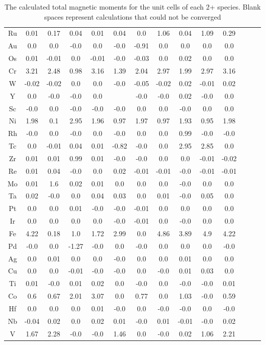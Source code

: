 \documentclass{article}
\begin{document}
\begin{table}
\begin{center}
\begin{tabular}{| c | c | c | c | c | c | c | c | c | c | c | c | c | c |}
Ru & 0.01 & 0.17 & 0.04 & 0.01 & 0.04 & 0.0 & 1.06 & 0.04 & 1.09 & 0.29 &  \\
Au & 0.0 & 0.0 & -0.0 & 0.0 & -0.0 & -0.91 & 0.0 & 0.0 & 0.0 & 0.0 &  \\
Os & 0.01 & -0.01 & 0.0 & -0.01 & -0.0 & -0.03 & 0.0 & 0.02 & 0.0 & 0.0 &  \\
Cr & 3.21 & 2.48 & 0.98 & 3.16 & 1.39 & 2.04 & 2.97 & 1.99 & 2.97 & 3.16 &  \\
W & -0.02 & -0.02 & 0.0 & 0.0 & -0.0 & -0.05 & -0.02 & 0.02 & -0.01 & 0.02 &  \\
Y & 0.0 & -0.0 & -0.0 & 0.0 &  & -0.0 & -0.0 & 0.02 & -0.0 & 0.0 &  \\
Sc & -0.0 & 0.0 & -0.0 & -0.0 & -0.0 & 0.0 & 0.0 & -0.0 & 0.0 & 0.0 &  \\
Ni & 1.98 & 0.1 & 2.95 & 1.96 & 0.97 & 1.97 & 0.97 & 1.93 & 0.95 & 1.98 &  \\
Rh & -0.0 & 0.0 & -0.0 & 0.0 & -0.0 & 0.0 & 0.0 & 0.99 & -0.0 & -0.0 &  \\
Tc & 0.0 & -0.01 & 0.04 & 0.01 & -0.82 & -0.0 & 0.0 & 2.95 & 2.85 & 0.0 &  \\
Zr & 0.01 & 0.01 & 0.99 & 0.01 & -0.0 & -0.0 & 0.0 & 0.0 & -0.01 & -0.02 &  \\
Re & 0.01 & 0.04 & -0.0 & 0.0 & 0.02 & -0.01 & -0.01 & -0.0 & -0.01 & -0.01 &  \\
Mo & 0.01 & 1.6 & 0.02 & 0.01 & 0.0 & 0.0 & 0.0 & -0.0 & 0.0 & 0.0 &  \\
Ta & 0.02 & -0.0 & 0.0 & 0.04 & 0.03 & 0.0 & 0.01 & -0.0 & 0.05 & 0.0 &  \\
Pt & 0.0 & 0.0 & 0.01 & -0.0 & -0.0 & -0.01 & 0.0 & 0.0 & 0.0 & 0.0 &  \\
Ir & 0.0 & 0.0 & 0.0 & 0.0 & -0.0 & -0.01 & 0.0 & -0.0 & 0.0 & 0.0 &  \\
Fe & 4.22 & 0.18 & 1.0 & 1.72 & 2.99 & 0.0 & 4.86 & 3.89 & 4.9 & 4.22 &  \\
Pd & -0.0 & 0.0 & -1.27 & -0.0 & 0.0 & -0.0 & 0.0 & 0.0 & 0.0 & -0.0 &  \\
Ag & 0.0 & 0.01 & 0.0 & 0.0 & -0.0 & 0.0 & 0.0 & 0.01 & 0.0 & 0.0 &  \\
Cu & 0.0 & 0.0 & -0.01 & -0.0 & -0.0 & 0.0 & -0.0 & 0.01 & 0.03 & 0.0 &  \\
Ti & 0.01 & -0.0 & 0.01 & 0.02 & 0.0 & -0.0 & 0.0 & -0.0 & -0.0 & 0.01 &  \\
Co & 0.6 & 0.67 & 2.01 & 3.07 & 0.0 & 0.77 & 0.0 & 1.03 & -0.0 & 0.59 &  \\
Hf & 0.0 & 0.0 & 0.0 & 0.01 & -0.0 & 0.0 & -0.0 & -0.0 & 0.0 & -0.0 &  \\
Nb & -0.04 & 0.02 & 0.0 & 0.02 & 0.01 & -0.0 & 0.01 & -0.01 & -0.0 & 0.02 &  \\
V & 1.67 & 2.28 & -0.0 & -0.0 & 1.46 & 0.0 & -0.0 & 0.02 & 1.06 & 2.21 &  \\
\hline
\end{tabular}
\end{center}
\caption{The calculated total magnetic moments for the unit cells of each 2+ species. Blank spaces represent calculations that could not be converged}
\label{table:mags}
\end{table}
\end{document}
